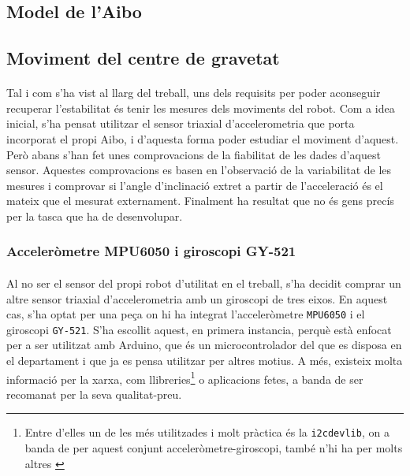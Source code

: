 \documentclass[12pt,a4paper,final,twoside]{article}
\begin{document}
\subsection{Model de l'Aibo}

\subsection{Moviment del centre de gravetat}


\paragraph{}Tal i com s'ha vist al llarg del treball, uns dels requisits per poder aconseguir recuperar l'estabilitat és tenir les mesures dels moviments del robot. Com a idea inicial, s'ha pensat utilitzar el sensor triaxial d'accelerometria que porta incorporat el propi Aibo, i d'aquesta forma poder estudiar el moviment d'aquest. Però abans s'han fet unes comprovacions de la fiabilitat de les dades d'aquest sensor. Aquestes comprovacions es basen en l'observació de la variabilitat de les mesures i comprovar si l'angle d'inclinació extret a partir de l'acceleració és el mateix que el mesurat externament. Finalment ha resultat que no és gens precís per la tasca que ha de desenvolupar.

\subsubsection{Acceleròmetre MPU6050 i giroscopi GY-521}

\paragraph{}Al no ser el sensor del propi robot d'utilitat en el treball, s'ha decidit comprar un altre sensor triaxial d'accelerometria amb un giroscopi de tres eixos. En aquest cas, s'ha optat per una peça on hi ha integrat l'acceleròmetre \texttt{MPU6050} i el giroscopi \texttt{GY-521}. S'ha escollit aquest, en primera instancia, perquè està enfocat per a ser utilitzat amb Arduino, que és un microcontrolador del que es disposa en el departament i que ja es pensa utilitzar per altres motius. A més, existeix molta informació per la xarxa, com llibreries\footnote{Entre d'elles un de les més utilitzades i molt pràctica és la \texttt{i2cdevlib}, on a banda de per aquest conjunt acceleròmetre-giroscopi, també n'hi ha per molts altres \cite{Rowberg}} o aplicacions fetes, a banda de ser recomanat per la seva qualitat-preu.
\end{document}
